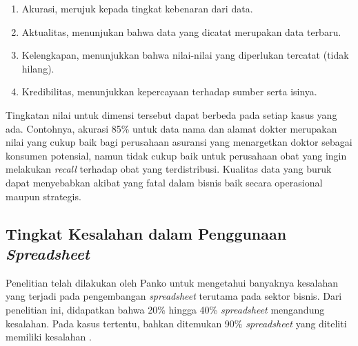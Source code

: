     \begin{enumerate}
        \item Akurasi, merujuk kepada tingkat kebenaran dari data.
        \item Aktualitas, menunjukan bahwa data yang dicatat merupakan data terbaru.
        \item Kelengkapan, menunjukkan bahwa nilai-nilai yang diperlukan tercatat (tidak hilang).
        \item Kredibilitas, menunjukkan kepercayaan terhadap sumber serta isinya.
    \end{enumerate}

Tingkatan nilai untuk dimensi tersebut dapat berbeda pada setiap kasus yang ada. Contohnya, akurasi 85\% untuk data nama dan alamat dokter merupakan nilai yang cukup baik bagi perusahaan asuransi yang menargetkan doktor sebagai konsumen potensial, namun tidak cukup baik untuk perusahaan obat yang ingin melakukan \textit{recall} terhadap obat yang terdistribusi. Kualitas data yang buruk dapat menyebabkan akibat yang fatal dalam bisnis baik secara operasional maupun strategis. 

\subsection{Tingkat Kesalahan dalam Penggunaan \textit{Spreadsheet}}
Penelitian telah dilakukan oleh Panko \parencite{Panko1998} untuk mengetahui banyaknya kesalahan yang terjadi pada pengembangan \textit{spreadsheet} terutama pada sektor bisnis. Dari penelitian ini, didapatkan bahwa 20\% hingga 40\% \textit{spreadsheet} mengandung kesalahan. Pada kasus tertentu, bahkan ditemukan 90\% \textit{spreadsheet} yang diteliti memiliki kesalahan \parencite{Journal1996}. 

